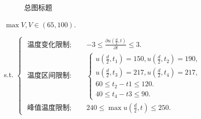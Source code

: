 \documentclass[fontset=windows]{whutmod}
\begin{document}
\begin{figure}
	\centering    
	\caption{总图标题}		%
\end{figure}



\newpage

\begin{center}
	$\max V, V \in(65,100) .$
	
	s.t. $\begin{cases}\text { 温度变化限制; } \quad & -3 \leq \frac{\partial u\left(\frac{d}{2}, t\right)}{\partial t} \leq 3 . 
		\\ \text { 温度区间限制: } & \left\{\begin{array}{l}u\left(\frac{d}{2}, t_{1}\right)=150, u\left(\frac{d}{2}, t_{2}\right)=190, \\ u\left(\frac{d}{2}, t_{3}\right)=217, u\left(\frac{d}{2}, t_{4}\right)=217, \\ 60 \leq t_{2}-t {1} \leq 120 . \\ 40 \leq t_{4}-t {3} \leq 90 .\end{array}\right. 
		\\ \text { 峰值温度限制; } \quad & 240 \leq \max u\left(\frac{d}{2}, t\right) \leq 250 .\end{cases}$
\end{center}
\end{document}
